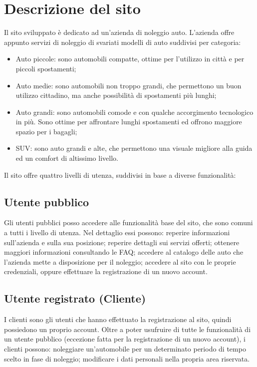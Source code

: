 \documentclass[12pt,a4paperS]{report}
\begin{document}
	\hypertarget{descrizione}{\chapter{Descrizione del sito}}
	\label{descrizione}
		\begin{normalsize}
			Il sito sviluppato è dedicato ad un'azienda di noleggio auto.
			L'azienda offre appunto servizi di noleggio di svariati modelli di auto suddivisi per categoria:
			\begin{itemize}
				\item Auto piccole: sono automobili compatte, ottime per l'utilizzo in città e per piccoli spostamenti;
				\item Auto medie: sono automobili non troppo grandi, che permettono un buon utilizzo cittadino, ma anche possibilità di spostamenti più lunghi;
				\item Auto grandi: sono automobili comode e con qualche accorgimento tecnologico in più. Sono ottime per affrontare lunghi spostamenti ed offrono maggiore spazio per i bagagli;
				\item SUV: sono auto grandi e alte, che permettono una visuale migliore alla guida ed un comfort di altissimo livello.
			\end{itemize}
			Il sito offre quattro livelli di utenza, suddivisi in base a diverse funzionalità:
			
			\section{Utente pubblico}
				Gli utenti pubblici posso accedere alle funzionalità base del sito, che sono comuni a tutti i livello di utenza.
				\newline
				Nel dettaglio essi possono: reperire informazioni sull'azienda e sulla sua posizione; reperire dettagli sui servizi offerti; ottenere maggiori informazioni consultando le FAQ; accedere al catalogo delle auto che l'azienda mette a disposizione per il noleggio; accedere al sito con le proprie credenziali, oppure effettuare la registrazione di un nuovo account.
				
			\section{Utente registrato (Cliente)}
				I clienti sono gli utenti che hanno effettuato la registrazione al sito, quindi possiedono un proprio account.
				\newline
				Oltre a poter usufruire di tutte le funzionalità di un utente pubblico (eccezione fatta per la registrazione di un nuovo account), i clienti possono: noleggiare un'automobile per un determinato periodo di tempo scelto in fase di noleggio; modificare i dati personali nella propria area riservata.
			

\end{normalsize}
\end{document}

